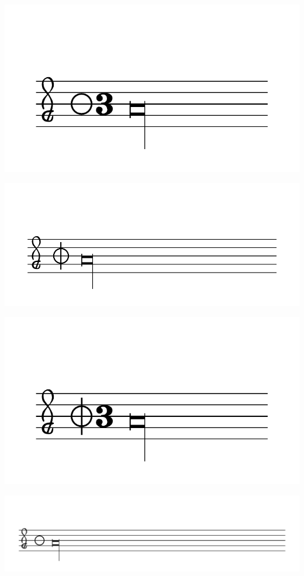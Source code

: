\documentclass{article}
\begin{document}
        \includegraphics[scale=0.5]{figures_tests/pdf/smens/perfectmeter3.pdf}

        \includegraphics[scale=0.5]{figures_tests/pdf/smens/perfectmeter4.pdf}

        \includegraphics[scale=0.5]{figures_tests/pdf/smens/perfectmeter5.pdf}

        \includegraphics[scale=0.5]{figures_tests/pdf/smens/perfectmeter6.pdf}
\end{document}
